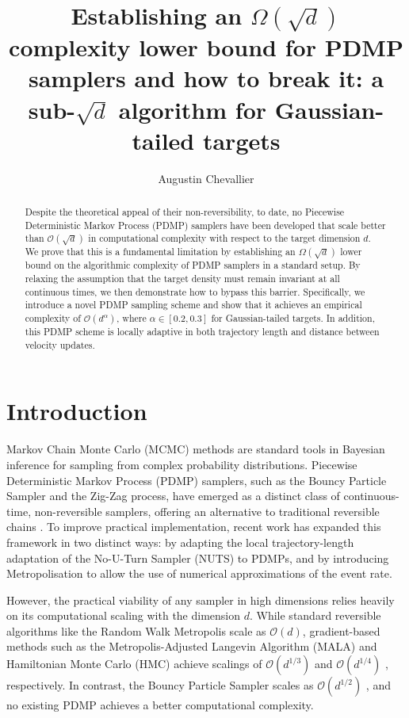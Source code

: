 \documentclass{article}
\title{Establishing an $\Omega(\sqrt{d})$ complexity lower bound for PDMP samplers and how to break it: a sub-$\sqrt{d}$ algorithm for Gaussian-tailed targets}
\author{Augustin Chevallier}
\affil{Université de Strasbourg \\ a.chevallier@unistra.fr}
\begin{document}
\maketitle

\begin{abstract}
Despite the theoretical appeal of their non-reversibility, to date, no Piecewise Deterministic Markov Process (PDMP) samplers have been developed that scale better than $\mathcal{O}(\sqrt{d})$ in computational complexity with respect to the target dimension $d$. We prove that this is a fundamental limitation by establishing an $\Omega(\sqrt{d})$ lower bound on the algorithmic complexity of PDMP samplers in a standard setup. By relaxing the assumption that the target density must remain invariant at all continuous times, we then demonstrate how to bypass this barrier. Specifically, we introduce a novel PDMP sampling scheme and show that it achieves an empirical complexity of $\mathcal{O}(d^\alpha)$, where $\alpha \in [0.2, 0.3]$ for Gaussian-tailed targets. In addition, this PDMP scheme is locally adaptive in both trajectory length and distance between velocity updates.
\end{abstract}


\section{Introduction}

Markov Chain Monte Carlo (MCMC) methods are standard tools in Bayesian inference for sampling from complex probability distributions. Piecewise Deterministic Markov Process (PDMP) samplers, such as the Bouncy Particle Sampler and the Zig-Zag process, have emerged as a distinct class of continuous-time, non-reversible samplers, offering an alternative to traditional reversible chains \cite{fearnhead2018piecewise,bouchard2018bouncy,bierkens2019zig}. To improve practical implementation, recent work \cite{chevallier2025practicalpdmpsamplingmetropolis} has expanded this framework in two distinct ways: by adapting the local trajectory-length adaptation of the No-U-Turn Sampler (NUTS) \cite{hoffman2014no} to PDMPs, and by introducing Metropolisation to allow the use of numerical approximations of the event rate. 

However, the practical viability of any sampler in high dimensions relies heavily on its computational scaling with the dimension $d$. While standard reversible algorithms like the Random Walk Metropolis \cite{roberts1997weak} scale as $\mathcal{O}(d)$, gradient-based methods such as the Metropolis-Adjusted Langevin Algorithm (MALA) \cite{roberts1998optimal} and Hamiltonian Monte Carlo (HMC) \cite{neal2011mcmc, betancourt2017conceptual} achieve scalings of $\mathcal{O}(d^{1/3})$ and $\mathcal{O}(d^{1/4})$ \cite{beskos2013optimal}, respectively. In contrast, the Bouncy Particle Sampler scales as $\mathcal{O}(d^{1/2})$ \cite{deligiannidis2021scaling}, and no existing PDMP achieves a better computational complexity.
\end{document}
